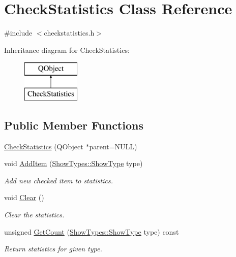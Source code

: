 \hypertarget{class_check_statistics}{\section{Check\-Statistics Class Reference}
\label{class_check_statistics}
}


{\ttfamily \#include $<$checkstatistics.\-h$>$}

Inheritance diagram for Check\-Statistics\-:\begin{figure}[H]
\begin{center}
\leavevmode
\includegraphics[height=2.000000cm]{class_check_statistics}
\end{center}
\end{figure}
\subsection*{Public Member Functions}
\begin{DoxyCompactItemize}
\item 
\hyperlink{class_check_statistics_a2507c3be0cb1810fc36676678962c709}{Check\-Statistics} (Q\-Object $\ast$parent=N\-U\-L\-L)
\item 
void \hyperlink{class_check_statistics_a15c69cca2e8954dcc575e1d3362ce4fd}{Add\-Item} (\hyperlink{class_show_types_a92c368f2a33741268265ac2d931eae3f}{Show\-Types\-::\-Show\-Type} type)
\begin{DoxyCompactList}\small\item\em Add new checked item to statistics. \end{DoxyCompactList}\item 
void \hyperlink{class_check_statistics_ae816397c8dae3ac4b4a87f71753c4d80}{Clear} ()
\begin{DoxyCompactList}\small\item\em Clear the statistics. \end{DoxyCompactList}\item 
unsigned \hyperlink{class_check_statistics_ae2ff192e0aa2828f703b8ca90f077156}{Get\-Count} (\hyperlink{class_show_types_a92c368f2a33741268265ac2d931eae3f}{Show\-Types\-::\-Show\-Type} type) const 
\begin{DoxyCompactList}\small\item\em Return statistics for given type. \end{DoxyCompactList}\end{DoxyCompactItemize}


